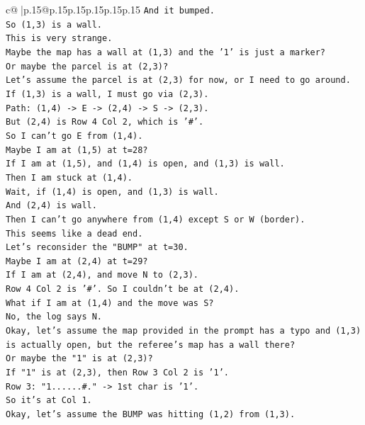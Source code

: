 \documentclass{article}
\begin{document}
{\begin{supertabular}{c@{$\;$}|p{.15\linewidth}@{}p{.15\linewidth}p{.15\linewidth}p{.15\linewidth}p{.15\linewidth}p{.15\linewidth}}
{{{\texttt{And it bumped.} \\
\texttt{So (1,3) is a wall.} \\
\texttt{This is very strange.} \\
\texttt{Maybe the map has a wall at (1,3) and the '1' is just a marker?} \\
\texttt{Or maybe the parcel is at (2,3)?} \\
\texttt{Let's assume the parcel is at (2,3) for now, or I need to go around.} \\
\texttt{If (1,3) is a wall, I must go via (2,3).} \\
\texttt{Path: (1,4) {-}> E {-}> (2,4) {-}> S {-}> (2,3).} \\
\texttt{But (2,4) is Row 4 Col 2, which is '\#'.} \\
\texttt{So I can't go E from (1,4).} \\
\texttt{Maybe I am at (1,5) at t=28?} \\
\texttt{If I am at (1,5), and (1,4) is open, and (1,3) is wall.} \\
\texttt{Then I am stuck at (1,4).} \\
\texttt{Wait, if (1,4) is open, and (1,3) is wall.} \\
\texttt{And (2,4) is wall.} \\
\texttt{Then I can't go anywhere from (1,4) except S or W (border).} \\
\texttt{This seems like a dead end.} \\
\texttt{Let's reconsider the "BUMP" at t=30.} \\
\texttt{Maybe I am at (2,4) at t=29?} \\
\texttt{If I am at (2,4), and move N to (2,3).} \\
\texttt{Row 4 Col 2 is '\#'. So I couldn't be at (2,4).} \\
\texttt{What if I am at (1,4) and the move was S?} \\
\texttt{No, the log says N.} \\
\texttt{Okay, let's assume the map provided in the prompt has a typo and (1,3) is actually open, but the referee's map has a wall there?} \\
\texttt{Or maybe the "1" is at (2,3)?} \\
\texttt{If "1" is at (2,3), then Row 3 Col 2 is '1'.} \\
\texttt{Row 3: "1......\#." {-}> 1st char is '1'.} \\
\texttt{So it's at Col 1.} \\
\texttt{Okay, let's assume the BUMP was hitting (1,2) from (1,3).} \\
}}}
\end{supertabular}}
\end{document}
